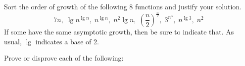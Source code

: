 \documentclass[a4paper]{exam}
\begin{document}
\begin{questions}
  
\question[5]
  Sort the order of growth of the following 8 functions and justify your solution.
  \[
    7n,\; \lg n^{\lg n},\; n^{\lg n},\; n^2\lg n,\; \left(\frac{n}{2}\right)^{\frac{n}{2}},\; 3^{n^3},\; n^{\lg 3},\; n^2
  \]
  If some have the same asymptotic growth, then be sure to indicate that. As usual, $\lg$ indicates a base of 2.
    \begin{solution}
      
    \end{solution}

\question
  Prove or disprove each of the following:


\end{questions}
\end{document}

